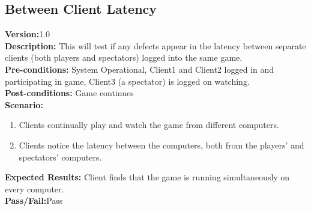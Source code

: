 \documentclass[12pt]{article}
\begin{document}
\subsection{Between Client Latency}
\textbf{Version:}1.0\\
\textbf{Description:} This will test if any defects appear in the latency between separate clients (both players and spectators) logged into the same game.\\
\textbf{Pre-conditions:} System Operational, Client1 and Client2 logged in and participating in game, Client3 (a spectator) is logged on watching. \\
\textbf{Post-conditions:} Game continues\\
\textbf{Scenario:}
\begin{enumerate}
\item Clients continually play and watch the game from different computers.\\
\item Clients notice the latency between the computers, both from the players' and spectators' computers.\\
\end{enumerate}
\textbf{Expected Results:} Client finds that the game is running simultaneously on every computer.\\
\textbf{Pass/Fail:}Pass\\
\end{document}
